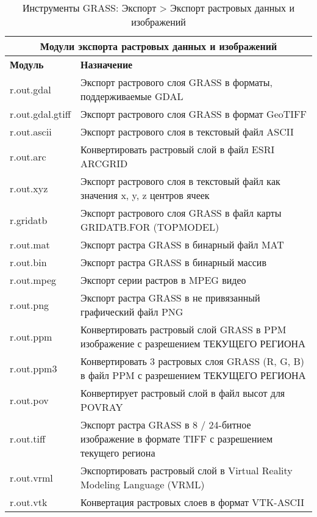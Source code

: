 {\renewcommand{\arraystretch}{0.7}
\begin{table}[H]
\centering
 \begin{tabular}{|p{4cm}|p{10cm}|}
  \hline \multicolumn{2}{|c|}{\textbf{Модули экспорта растровых данных
  и изображений}} \\
  \hline \textbf{Модуль} & \textbf{Назначение} \\
  \hline r.out.gdal & Экспорт растрового слоя GRASS в форматы,
  поддерживаемые GDAL \\
  \hline r.out.gdal.gtiff & Экспорт растрового слоя GRASS в формат GeoTIFF \\
  \hline r.out.ascii & Экспорт растрового слоя в текстовый файл ASCII \\
  \hline r.out.arc & Конвертировать растровый слой в файл ESRI ARCGRID \\
  \hline r.out.xyz & Экспорт растрового слоя в текстовый файл как значения
  x, y, z центров ячеек \\
  \hline r.gridatb & Экспорт растрового слоя GRASS в файл карты GRIDATB.FOR
  (TOPMODEL) \\
  \hline r.out.mat & Экспорт растра GRASS в бинарный файл MAT \\
  \hline r.out.bin & Экспорт растра GRASS в бинарный массив \\
  \hline r.out.mpeg & Экспорт серии растров в MPEG видео \\
  \hline r.out.png & Экспорт растра GRASS в не привязанный графический
  файл PNG \\
  \hline r.out.ppm & Конвертировать растровый слой GRASS в PPM
  изображение с разрешением ТЕКУЩЕГО РЕГИОНА \\
  \hline r.out.ppm3 & Конвертировать 3 растровых слоя GRASS (R, G, B) в
  файл PPM с разрешением ТЕКУЩЕГО РЕГИОНА \\
  \hline r.out.pov & Конвертирует растровый слой в файл высот для POVRAY \\
  \hline r.out.tiff & Экспорт растра GRASS в 8 / 24-битное изображение в
  формате TIFF с разрешением текущего региона \\
  \hline r.out.vrml & Экспортировать растровый слой в Virtual Reality
  Modeling Language (VRML) \\
  \hline r.out.vtk & Конвертация растровых слоев в формат VTK-ASCII \\
\hline
\end{tabular}
\caption{Инструменты GRASS: Экспорт > Экспорт растровых данных и изображений}
\end{table}}


